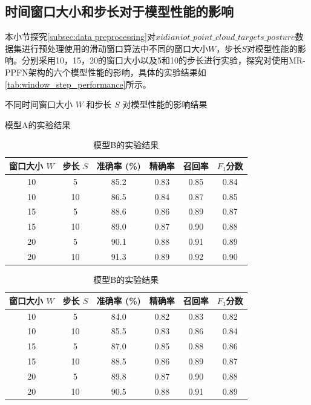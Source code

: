 \subsection{时间窗口大小和步长对于模型性能的影响}
本小节探究\eqref{subsec:data preprocessing}对$xidianiot\_point\_cloud\_targets\_posture$数据集进行预处理使用的滑动窗口算法中不同的窗口大小$W$，步长$S$对模型性能的影响。分别采用10，15，20的窗口大小以及5和10的步长进行实验，探究对使用MR-PPFN架构的六个模型性能的影响，具体的实验结果如\eqref{tab:window_step_performance}所示。

\begin{table}[htbp]
    \caption{不同时间窗口大小 $W$ 和步长 $S$ 对模型性能的影响结果}
    \label{tab:window_step_performance}
    \centering

    \begin{subtable}{\linewidth}
        \centering
        \caption{模型A的实验结果}
        \begin{tabular}{cc|cccc}
            \toprule
            窗口大小 $W$ & 步长 $S$ & 准确率 (\%) & 精确率 & 召回率 & $F_1$分数 \\
            \midrule
            10 & 5 & 85.2 & 0.83 & 0.85 & 0.84 \\
            10 & 10 & 86.5 & 0.84 & 0.87 & 0.85 \\
            15 & 5 & 88.6 & 0.86 & 0.89 & 0.87 \\
            15 & 10 & 89.0 & 0.87 & 0.90 & 0.88 \\
            20 & 5 & 90.1 & 0.88 & 0.91 & 0.89 \\
            20 & 10 & 91.3 & 0.89 & 0.92 & 0.90 \\
            \bottomrule
        \end{tabular}
        \label{tab:modelA_performance}
    \end{subtable}

    \vspace{0.4cm} 

    \begin{subtable}{\linewidth}
        \centering
        \caption{模型B的实验结果}
        \begin{tabular}{cc|cccc}
            \toprule
            窗口大小 $W$ & 步长 $S$ & 准确率 (\%) & 精确率 & 召回率 & $F_1$分数 \\
            \midrule
            10 & 5 & 84.0 & 0.82 & 0.83 & 0.82 \\
            10 & 10 & 85.5 & 0.83 & 0.86 & 0.84 \\
            15 & 5 & 87.0 & 0.85 & 0.88 & 0.86 \\
            15 & 10 & 88.5 & 0.86 & 0.89 & 0.87 \\
            20 & 5 & 89.8 & 0.87 & 0.90 & 0.88 \\
            20 & 10 & 90.5 & 0.88 & 0.91 & 0.89 \\
            \bottomrule
        \end{tabular}
        \label{tab:modelB_performance}
    \end{subtable}
\end{table}

